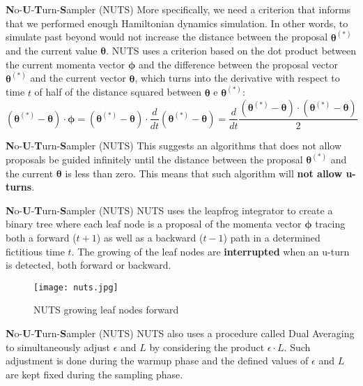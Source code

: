 \begin{frame}{\textbf{N}o-\textbf{U}-\textbf{T}urn-\textbf{S}ampler (NUTS)}
	More specifically, we need a criterion that informs that we performed
	enough Hamiltonian dynamics simulation.
	In other words, to simulate past beyond would not increase the distance
	between the proposal $\boldsymbol{\theta}^{(*)}$ and the current value $\boldsymbol{\theta}$.
	\vfill
	NUTS uses a criterion based on the dot product between the current momenta vector
	$\boldsymbol{\phi}$ and the difference between the proposal vector $\boldsymbol{\theta}^{(*)}$
	and the current vector $\boldsymbol{\theta}$,
	which turns into the derivative with respect to time $t$ of half of the distance squared between
	$\boldsymbol{\theta}$ e $\boldsymbol{\theta}^{(*)}$:
	$$
		(\boldsymbol{\theta}^{(*)} - \boldsymbol{\theta}) \cdot \boldsymbol{\phi}
		= (\boldsymbol{\theta}^{(*)} - \boldsymbol{\theta}) \cdot \frac{d}{dt} (\boldsymbol{\theta}^{(*)} - \boldsymbol{\theta})
		= \frac{d}{dt} \frac{(\boldsymbol{\theta}^{(*)} - \boldsymbol{\theta}) \cdot (\boldsymbol{\theta}^{(*)} - \boldsymbol{\theta})}{2}
	$$
\end{frame}

\begin{frame}{\textbf{N}o-\textbf{U}-\textbf{T}urn-\textbf{S}ampler (NUTS)}
	This suggests an algorithms that does not allow proposals be guided infinitely
	until the distance between the proposal $\boldsymbol{\theta}^{(*)}$ and the current
	$\boldsymbol{\theta}$ is less than zero.
	\vfill
	This means that such algorithm will \textbf{not allow u-turns}.
\end{frame}

\begin{frame}{\textbf{N}o-\textbf{U}-\textbf{T}urn-\textbf{S}ampler (NUTS)}
	NUTS uses the leapfrog integrator to create a binary tree where each leaf node
	is a proposal of the momenta vector $\boldsymbol{\phi}$ tracing both a forward
	($t+1$) as well as a backward ($t-1$) path in a determined fictitious time $t$.
	The growing of the leaf nodes are \textbf{interrupted} when an u-turn is detected,
	both forward or backward.
	\begin{figure}
		\centering
		\texttt{[image: nuts.jpg]}
		\caption{NUTS growing leaf nodes forward}
	\end{figure}
\end{frame}

\begin{frame}{\textbf{N}o-\textbf{U}-\textbf{T}urn-\textbf{S}ampler (NUTS)}
	NUTS also uses a procedure called Dual Averaging
	\parencite{nesterov2009primal} to simultaneously adjust $\epsilon$ and $L$
	by considering the product $\epsilon \cdot L$.
	\vfill
	Such adjustment is done during the warmup phase and the defined values of
	$\epsilon$ and $L$ are kept fixed during the sampling phase.
\end{frame}

